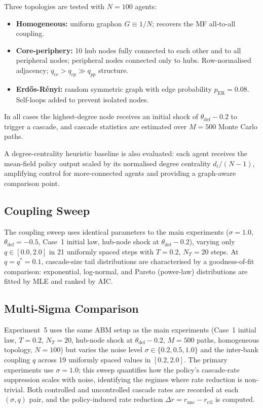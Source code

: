 \documentclass[11pt]{article}
\begin{document}
Three topologies are tested with $N = 100$ agents:
\begin{itemize}
  \item \textbf{Homogeneous:} uniform graphon $G \equiv 1/N$; recovers the MF all-to-all coupling.
  \item \textbf{Core-periphery:} 10 hub nodes fully connected to each other and to all peripheral nodes; peripheral nodes connected only to hubs. Row-normalised adjacency; $q_{cc} > q_{cp} \gg q_{pp}$ structure.
  \item \textbf{Erdős-Rényi:} random symmetric graph with edge probability $p_{\mathrm{ER}} = 0.08$. Self-loops added to prevent isolated nodes.
\end{itemize}
In all cases the highest-degree node receives an initial shock of $\theta_{\mathrm{def}} - 0.2$ to trigger a cascade, and cascade statistics are estimated over $M = 500$ Monte Carlo paths.

A degree-centrality heuristic baseline is also evaluated: each agent receives the mean-field policy output scaled by its normalised degree centrality $d_i/(N-1)$, amplifying control for more-connected agents and providing a graph-aware comparison point.

\subsection{Coupling Sweep}

The coupling sweep uses identical parameters to the main experiments ($\sigma = 1.0$, $\theta_{\mathrm{def}} = -0.5$, Case~1 initial law, hub-node shock at $\theta_{\mathrm{def}} - 0.2$), varying only $q \in [0.0, 2.0]$ in 21 uniformly spaced steps with $T = 0.2$, $N_T = 20$ steps. At $q = q^* = 0.1$, cascade-size tail distributions are characterised by a goodness-of-fit comparison: exponential, log-normal, and Pareto (power-law) distributions are fitted by MLE and ranked by AIC.

\subsection{Multi-Sigma Comparison}

Experiment~5 uses the same ABM setup as the main experiments (Case~1 initial law, $T = 0.2$, $N_T = 20$, hub-node shock at $\theta_{\mathrm{def}} - 0.2$, $M = 500$ paths, homogeneous topology, $N = 100$) but varies the noise level $\sigma \in \{0.2, 0.5, 1.0\}$ and the inter-bank coupling $q$ across 19 uniformly spaced values in $[0.2, 2.0]$. The primary experiments use $\sigma = 1.0$; this sweep quantifies how the policy's cascade-rate suppression scales with noise, identifying the regimes where rate reduction is non-trivial. Both controlled and uncontrolled cascade rates are recorded at each $(\sigma, q)$ pair, and the policy-induced rate reduction $\Delta r = r_{\mathrm{unc}} - r_{\mathrm{ctl}}$ is computed.
\end{document}
